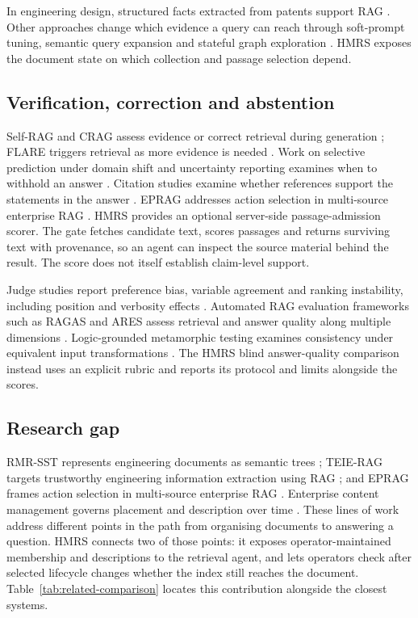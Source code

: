 In engineering design, structured facts extracted from patents support RAG
\citep{siddharth2024retrieval}. Other approaches change which evidence a
query can reach through soft-prompt tuning, semantic query expansion and
stateful graph exploration
\citep{peng2024soft,massai2023evaluatio,tao2025fine}. HMRS exposes the document
state on which collection and passage selection depend.

\subsection{Verification, correction and abstention}

Self-RAG and CRAG assess evidence or correct retrieval during generation
\citep{selfrag,crag}; FLARE triggers retrieval as more evidence is needed
\citep{flare}. Work on selective prediction under domain shift and
uncertainty reporting examines when to withhold an answer
\citep{kamath,feng-abstain,yin-knowwhat}. Citation studies examine whether
references support the statements in the answer
\citep{liu-verifiability,gao-citations}.
EPRAG addresses action selection in multi-source enterprise RAG
\citep{kinalioglu-kbs-eprag-2026}. HMRS provides an optional server-side
passage-admission scorer. The gate
fetches candidate text, scores passages and returns surviving text with
provenance, so an agent can inspect the source material behind the result.
The score does not itself establish claim-level support.

Judge studies report preference bias, variable agreement and ranking
instability, including position and verbosity effects
\citep{zheng-llmjudge,panickssery-selfpref,wang-llmnotfair}. Automated RAG
evaluation frameworks such as RAGAS and ARES assess retrieval and answer
quality along multiple dimensions \citep{es-ragas-2024,saad-falcon-ares-2024}.
Logic-grounded metamorphic testing examines consistency under equivalent
input transformations \citep{zhou2026lgmt}. The HMRS blind answer-quality
comparison instead uses an explicit rubric and reports its protocol and
limits alongside the scores.

\subsection{Research gap}
\label{sec:gap}

RMR-SST represents engineering documents as semantic trees
\citep{li-kbs-rmrsst-2026}; TEIE-RAG targets trustworthy engineering
information extraction using RAG \citep{shen-kbs-teierag-2026}; and EPRAG
frames action selection in multi-source enterprise RAG
\citep{kinalioglu-kbs-eprag-2026}. Enterprise content management governs
placement and description over time
\citep{paivarinta-ecm-2005,park-metadata-quality-2009}. These lines of
work address different points in the path from organising documents to
answering a question. HMRS connects two of those points: it exposes
operator-maintained membership and descriptions to the retrieval agent,
and lets operators check after selected lifecycle changes whether the
index still reaches the document. Table~\ref{tab:related-comparison}
locates this contribution alongside the closest systems.
